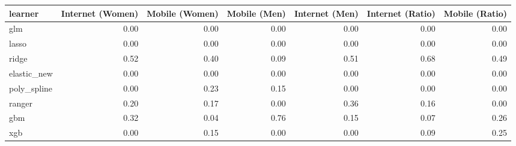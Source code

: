 \begin{table}[ht]
\centering
\begin{tabular}{lrrrrrr}
  \toprule
learner & Internet (Women) & Mobile (Women) & Mobile (Men) & Internet (Men) & Internet (Ratio) & Mobile (Ratio) \\ 
  \midrule
glm & 0.00 & 0.00 & 0.00 & 0.00 & 0.00 & 0.00 \\ 
  lasso & 0.00 & 0.00 & 0.00 & 0.00 & 0.00 & 0.00 \\ 
  ridge & 0.52 & 0.40 & 0.09 & 0.51 & 0.68 & 0.49 \\ 
  elastic\_new & 0.00 & 0.00 & 0.00 & 0.00 & 0.00 & 0.00 \\ 
  poly\_spline & 0.00 & 0.23 & 0.15 & 0.00 & 0.00 & 0.00 \\ 
  ranger & 0.20 & 0.17 & 0.00 & 0.36 & 0.16 & 0.00 \\ 
  gbm & 0.32 & 0.04 & 0.76 & 0.15 & 0.07 & 0.26 \\ 
  xgb & 0.00 & 0.15 & 0.00 & 0.00 & 0.09 & 0.25 \\ 
   \bottomrule
\end{tabular}
\end{table}
